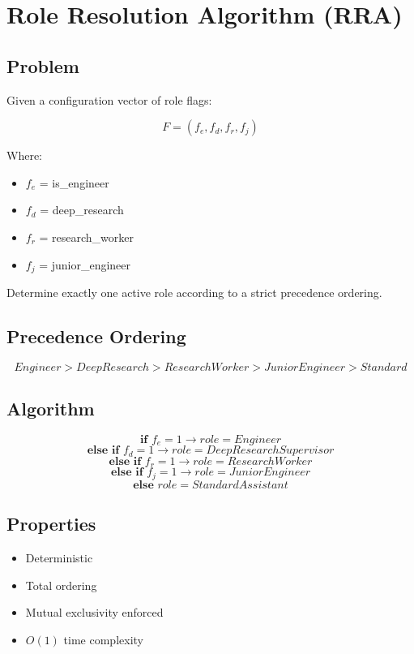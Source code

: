 \section{Role Resolution Algorithm (RRA)}

\subsection*{Problem}

Given a configuration vector of role flags:

\[
F = (f_e, f_d, f_r, f_j)
\]

Where:

\begin{itemize}
    \item $f_e$ = is\_engineer
    \item $f_d$ = deep\_research
    \item $f_r$ = research\_worker
    \item $f_j$ = junior\_engineer
\end{itemize}

Determine exactly one active role according to a strict precedence ordering.

\subsection*{Precedence Ordering}

\[
Engineer > DeepResearch > ResearchWorker > JuniorEngineer > Standard
\]

\subsection*{Algorithm}

\[
\textbf{if } f_e = 1 \rightarrow role = Engineer
\]
\[
\textbf{else if } f_d = 1 \rightarrow role = DeepResearchSupervisor
\]
\[
\textbf{else if } f_r = 1 \rightarrow role = ResearchWorker
\]
\[
\textbf{else if } f_j = 1 \rightarrow role = JuniorEngineer
\]
\[
\textbf{else } role = StandardAssistant
\]

\subsection*{Properties}

\begin{itemize}
    \item Deterministic
    \item Total ordering
    \item Mutual exclusivity enforced
    \item $O(1)$ time complexity
\end{itemize}